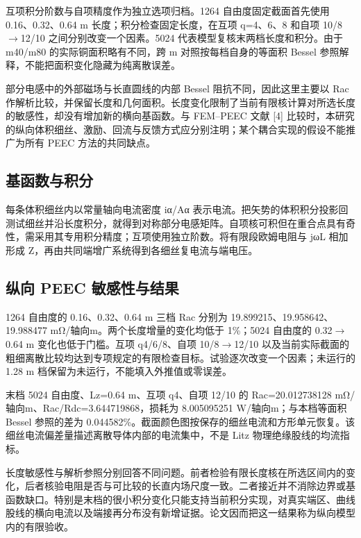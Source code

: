 \documentclass[journal,10pt]{IEEEtran}
\begin{document}
互项积分阶数与自项精度作为独立选项归档。1264 自由度固定截面首先使用 0.16、0.32、0.64 m 长度；积分检查固定长度，在互项 q=4、6、8 和自项 10/8\(\to\)12/10 之间分别改变一个因素。5024 代表模型复核末两档长度和积分。由于 m40/m80 的实际铜面积略有不同，跨 m 对照按每档自身的等面积 Bessel 参照解释，不能把面积变化隐藏为纯离散误差。


部分电感中的外部磁场与长直圆线的内部 Bessel 阻抗不同，因此这里主要以 Rac 作解析比较，并保留长度和几何面积。长度变化限制了当前有限核计算对所选长度的敏感性，却没有增加新的横向基函数。与 FEM–PEEC 文献 [4] 比较时，本研究的纵向体积细丝、激励、回流与反馈方式应分别注明；某个耦合实现的假设不能推广为所有 PEEC 方法的共同缺点。


\subsection*{基函数与积分}
\hypertarget{06.peec_derivation.heading}{}
每条体积细丝内以常量轴向电流密度 iα/Aα 表示电流。把矢势的体积积分投影回测试细丝并沿长度积分，就得到对称部分电感矩阵。自项核可积但在重合点具有奇性，需采用其专用积分精度；互项使用独立阶数。将有限段欧姆电阻与 jωL 相加形成 Z，再由共同端增广系统得到各细丝复电流与端电压。


\subsection*{纵向 PEEC 敏感性与结果}
\hypertarget{06.peec_results.heading}{}
1264 自由度的 0.16、0.32、0.64 m 三档 Rac 分别为 19.899215、19.958642、19.988477 mΩ/轴向m。两个长度增量的变化均低于 1\%；5024 自由度的 0.32\(\to\)0.64 m 变化也低于门槛。互项 q4/6/8、自项 10/8\(\to\)12/10 以及当前实际截面的粗细离散比较均达到专项规定的有限检查目标。试验逐次改变一个因素；未运行的 1.28 m 档保留为未运行，不能填入外推值或零误差。


末档 5024 自由度、Lz=0.64 m、互项 q4、自项 12/10 的 Rac=20.012738128 mΩ/轴向m、Rac/Rdc=3.644719868，损耗为 8.005095251 W/轴向m；与本档等面积 Bessel 参照的差为 0.044582\%。截面颜色图按保存的细丝电流和方形单元恢复。该细丝电流偏差量描述离散导体内部的电流集中，不是 Litz 物理绝缘股线的均流指标。


长度敏感性与解析参照分别回答不同问题。前者检验有限长度核在所选区间内的变化，后者核验电阻是否与可比较的长直内场尺度一致。二者接近并不消除边界或基函数缺口。特别是末档的很小积分变化只能支持当前积分实现，对真实端区、曲线股线的横向电流以及端接再分布没有新增证据。论文因而把这一结果称为纵向模型内的有限验收。
\end{document}
